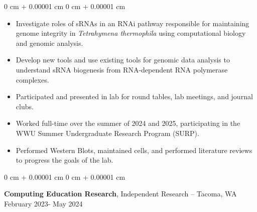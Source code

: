 \documentclass[10pt, article]{article}
\newenvironment{highlights}{
    \begin{itemize}[
        topsep=0.10 cm,
        parsep=0.10 cm,
        partopsep=0pt,
        itemsep=0pt,
        leftmargin=0 cm + 10pt
    ]
}{
    \end{itemize}
} %
\newenvironment{onecolentry}{
    \begin{adjustwidth}{
        0 cm + 0.00001 cm
    }{
        0 cm + 0.00001 cm
    }
}{
    \end{adjustwidth}
} %
\newenvironment{twocolentry}[2][]{
    \onecolentry
    \def\secondColumn{#2}
    \setcolumnwidth{\fill, 4.5 cm}
    \begin{paracol}{2}
}{
    \switchcolumn \raggedleft \secondColumn
    \end{paracol}
    \endonecolentry
} %
\begin{document}
        \begin{onecolentry}
            \begin{highlights}
            \item Investigate roles of sRNAs in an RNAi pathway responsible for maintaining genome integrity in \textit{Tetrahymena thermophila} using computational biology and genomic analysis.
            \item Develop new tools and use existing tools for genomic data analysis to understand sRNA biogenesis from RNA-dependent RNA polymerase complexes.
            \item Participated and presented in lab for round tables, lab meetings, and journal clubs.
            \item Worked full-time over the summer of 2024 and 2025, participating in the WWU Summer Undergraduate Research Program (SURP).
            \item Performed Western Blots, maintained cells, and performed literature reviews to progress the goals of the lab.
            \end{highlights}
        \end{onecolentry}


        \vspace{0.2 cm}

        \begin{twocolentry}{
            February 2023- May 2024
        }
            \textbf{Computing Education Research}, Independent Research -- Tacoma, WA\end{twocolentry}
\end{document}
